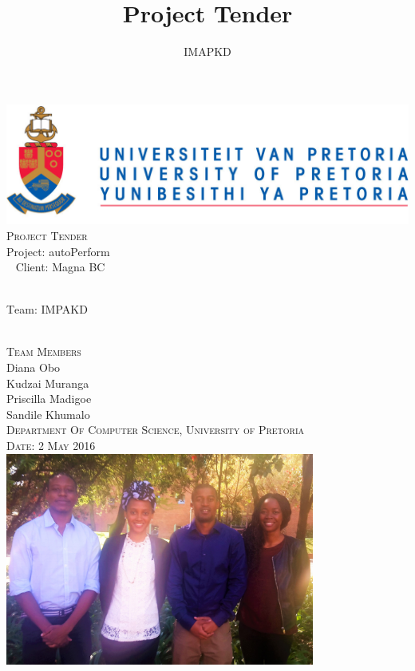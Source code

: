 \documentclass[a4paper,12pt]{article}
\author{IMAPKD}
\title{ Project Tender}
\begin{document}
\setlength{\parskip}{6pt}

\begin{titlepage}

\begin{center}
\includegraphics[width=1\textwidth]{./University_of_Pretoria_Logo.PNG}\\[0.4cm]    
\textsc{\Large Project Tender}\\[0.5cm]

{ \huge \textsc Project: autoPerform }\\[0.4cm]\
{ \huge \textsc Client: Magna BC  }\\[0.4cm]\

{ \huge \textsc Team: IMPAKD  }\\[0.4cm]\

\textsc{\Large Team Members}\\[0.5cm]

{\Large Diana {Obo}} \\[0.3cm]

{\Large Kudzai {Muranga}} \\[0.3cm]

{\Large Priscilla {Madigoe}}\\[0.3cm]

{\Large Sandile {Khumalo}}\\[0.5cm]

\textsc{ Department Of Computer Science, University of Pretoria}\\[0.3cm]
\textsc{Date: 2 May 2016}\\[0.3cm]

\includegraphics[width=4in]{./IMAPKD.jpg}

\vfill
\end{center}
\end{titlepage}
\end{document}
